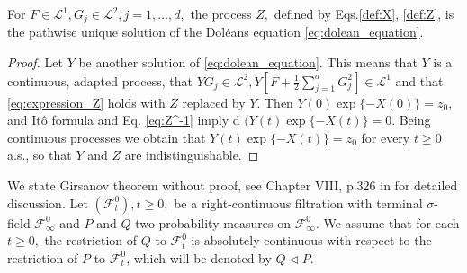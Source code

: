 \begin{proposition}
	For $F \in \mathcal{L}^{1}, G_{j} \in \mathcal{L}^{2}, j=1, \ldots, d,$ the process $Z,$ defined by Eqs.\eqref{def:X}, \eqref{def:Z}, is the pathwise unique solution of the Doléans equation \eqref{eq:dolean_equation}.
\end{proposition}

\begin{proof}
	Let $Y$ be another solution of \eqref{eq:dolean_equation}. This means that $Y$ is a continuous, adapted process, that $Y G_{j} \in \mathcal{L}^{2}, Y\left[F+\frac{1}{2} \sum_{j=1}^{d} G_{j}^{2}\right] \in \mathcal{L}^{1}$ and that \eqref{eq:expression_Z} holds with $Z$ replaced by $Y$. Then $Y(0) \exp \{-X(0)\}=z_{0}$, and Itô formula and Eq. \eqref{eq:Z^-1} imply d $(Y(t) \exp \{-X(t)\}=0$. Being continuous processes we obtain that $Y(t) \exp \{-X(t)\}=z_{0}$ for every $t \geq 0$ a.s., so that $Y$ and $Z$ are indistinguishable.
\end{proof}


%


We state Girsanov theorem without proof, see Chapter VIII, p.326 in \cite{revuz2013continuous} for detailed discussion. Let $\left(\mathscr{F}_{t}^{0}\right), t \geq 0,$ be a right-continuous filtration with terminal $\sigma$-field $\mathscr{F}_{\infty}^{0}$ and $P$ and $Q$ two probability measures on $\mathscr{F}_{\infty}^{0} .$ We assume that for each $t \geq 0,$ the restriction of $Q$ to $\mathscr{F}_{t}^{0}$ is absolutely continuous with respect to the restriction of $P$ to $\mathscr{F}_{t}^{0}$, which will be denoted by $Q \lhd P$.

